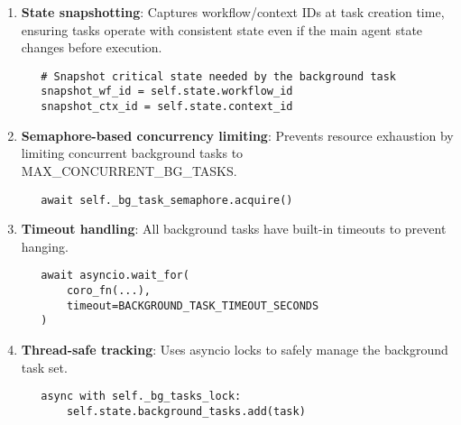 \documentclass[12pt,a4paper]{article}
\begin{document}
\begin{enumerate}[label=\arabic*.]
    \item \textbf{State snapshotting}: Captures workflow/context IDs at task creation time, ensuring tasks operate with consistent state even if the main agent state changes before execution.
    \begin{pageablecode}
    \begin{verbatim}
   # Snapshot critical state needed by the background task
   snapshot_wf_id = self.state.workflow_id
   snapshot_ctx_id = self.state.context_id
    \end{verbatim}
    \end{pageablecode}

    \item \textbf{Semaphore-based concurrency limiting}: Prevents resource exhaustion by limiting concurrent background tasks to MAX\_CONCURRENT\_BG\_TASKS.
    \begin{pageablecode}
    \begin{verbatim}
   await self._bg_task_semaphore.acquire()
    \end{verbatim}
    \end{pageablecode}

    \item \textbf{Timeout handling}: All background tasks have built-in timeouts to prevent hanging.
    \begin{pageablecode}
    \begin{verbatim}
   await asyncio.wait_for(
       coro_fn(...),
       timeout=BACKGROUND_TASK_TIMEOUT_SECONDS
   )
    \end{verbatim}
    \end{pageablecode}

    \item \textbf{Thread-safe tracking}: Uses asyncio locks to safely manage the background task set.
    \begin{pageablecode}
    \begin{verbatim}
   async with self._bg_tasks_lock:
       self.state.background_tasks.add(task)
    \end{verbatim}
    \end{pageablecode}


\end{enumerate}
\end{document}
